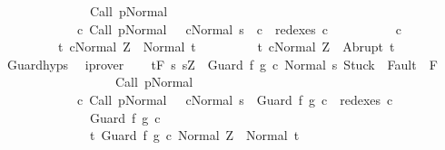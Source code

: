 \begin{isabellebody}
\ \ \ \ \ \ \ \ \ \ \ \ \ \ {\isasymGamma}{\isasymturnstile}Call\ p{\isasymdown}Normal\ {\isasymsigma}\ {\isasymand}\ \isanewline
\ \ \ \ \ \ \ \ \ \ \ \ {\isacharparenleft}{\isasymexists}c{\isacharprime}{\isachardot}\ {\isasymGamma}{\isasymturnstile}{\isacharparenleft}Call\ p{\isacharcomma}Normal\ {\isasymsigma}{\isacharparenright}\ {\isasymrightarrow}\isactrlsup {\isacharplus}\ {\isacharparenleft}c{\isacharprime}{\isacharcomma}Normal\ s{\isacharparenright}\ {\isasymand}\ c\ {\isasymin}\ redexes\ c{\isacharprime}{\isacharparenright}{\isacharbraceright}\isanewline
\ \ \ \ \ \ \ \ \ \ c\ \isanewline
\ \ \ \ \ \ \ \ \ {\isacharbraceleft}t{\isachardot}\ {\isasymGamma}{\isasymturnstile}{\isasymlangle}c{\isacharcomma}Normal\ Z{\isasymrangle}\ {\isasymRightarrow}\ Normal\ t{\isacharbraceright}{\isacharcomma}\isanewline
\ \ \ \ \ \ \ \ \ {\isacharbraceleft}t{\isachardot}\ {\isasymGamma}{\isasymturnstile}{\isasymlangle}c{\isacharcomma}Normal\ Z{\isasymrangle}\ {\isasymRightarrow}\ Abrupt\ t{\isacharbraceright}{\isachardoublequoteclose}\isanewline
\ \ \ \ \isamarkupfalse%
\ Guard{\isachardot}hyps\ \isamarkupfalse%
\ iprover\isanewline
\ \ \isamarkupfalse%
\ {\isachardoublequoteopen}{\isasymGamma}{\isacharcomma}{\isasymTheta}{\isasymturnstile}\isactrlsub t\isactrlbsub {\isacharslash}F\isactrlesub \ {\isacharbraceleft}s{\isachardot}\ s{\isacharequal}Z\ {\isasymand}\ {\isasymGamma}{\isasymturnstile}{\isasymlangle}Guard\ f\ g\ c\ {\isacharcomma}Normal\ s{\isasymrangle}\ {\isasymRightarrow}{\isasymnotin}{\isacharparenleft}{\isacharbraceleft}Stuck{\isacharbraceright}\ {\isasymunion}\ Fault\ {\isacharbackquote}\ {\isacharparenleft}{\isacharminus}F{\isacharparenright}{\isacharparenright}\ {\isasymand}\ \isanewline
\ \ \ \ \ \ \ \ \ \ \ \ \ \ \ \ \ \ {\isasymGamma}{\isasymturnstile}Call\ p{\isasymdown}Normal\ {\isasymsigma}\ {\isasymand}\isanewline
\ \ \ \ \ \ \ \ \ \ \ \ {\isacharparenleft}{\isasymexists}c{\isacharprime}{\isachardot}\ {\isasymGamma}{\isasymturnstile}{\isacharparenleft}Call\ p{\isacharcomma}Normal\ {\isasymsigma}{\isacharparenright}\ {\isasymrightarrow}\isactrlsup {\isacharplus}\ {\isacharparenleft}c{\isacharprime}{\isacharcomma}Normal\ s{\isacharparenright}\ {\isasymand}\ Guard\ f\ g\ c\ {\isasymin}\ redexes\ c{\isacharprime}{\isacharparenright}{\isacharbraceright}\isanewline
\ \ \ \ \ \ \ \ \ \ \ \ \ \ Guard\ f\ g\ c\ \ \isanewline
\ \ \ \ \ \ \ \ \ \ \ \ \ \ {\isacharbraceleft}t{\isachardot}\ {\isasymGamma}{\isasymturnstile}{\isasymlangle}Guard\ f\ g\ c\ {\isacharcomma}Normal\ Z{\isasymrangle}\ {\isasymRightarrow}\ Normal\ t{\isacharbraceright}{\isacharcomma}\isanewline

\end{isabellebody}
